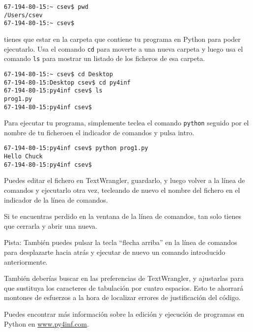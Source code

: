 \beforeverb
\begin{verbatim}
67-194-80-15:~ csev$ pwd
/Users/csev
67-194-80-15:~ csev$ 
\end{verbatim}
\afterverb
%
tienes que estar en la carpeta que contiene tu programa en Python
para poder ejecutarlo. Usa el comando {\tt cd} para moverte a una nueva carpeta
y luego usa el comando {\tt ls} para mostrar un listado de los ficheros
de esa carpeta.

\beforeverb
\begin{verbatim}
67-194-80-15:~ csev$ cd Desktop
67-194-80-15:Desktop csev$ cd py4inf
67-194-80-15:py4inf csev$ ls
prog1.py
67-194-80-15:py4inf csev$ 
\end{verbatim}
\afterverb
%
Para ejecutar tu programa, simplemente teclea el comando {\tt python} seguido
por el nombre de tu ficheroen el indicador de comandos y pulsa intro.

\beforeverb
\begin{verbatim}
67-194-80-15:py4inf csev$ python prog1.py
Hello Chuck
67-194-80-15:py4inf csev$ 
\end{verbatim}
\afterverb
%
Puedes editar el fichero en TextWrangler, guardarlo, y luego volver
a la línea de comandos y ejecutarlo otra vez, tecleando de nuevo
el nombre del fichero en el indicador de la línea de comandos.

Si te encuentras perdido en la ventana de la línea de comandos, tan solo tienes
que cerrarla y abrir una nueva.

Pista: También puedes pulsar la tecla ``flecha arriba'' en la línea de comandos para
desplazarte hacia atrás y ejecutar de nuevo un comando introducido anteriormente.

También deberías buscar en las preferencias de TextWrangler, y ajustarlas para
que sustituya los caracteres de tabulación por cuatro espacios. Esto te ahorrará
montones de esfuerzos a la hora de localizar errores de justificación del código.

Puedes encontrar más información sobre la edición y ejecución de
programas en Python en \url{www.py4inf.com}.


